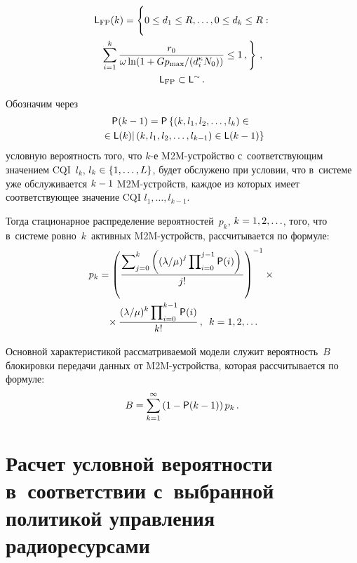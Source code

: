 \begin{multicols}{2}
  \vspace*{-12pt}
  
  \noindent
  \begin{multline}
  {\sf L}_{\mathrm{FP}}(k)= \left\{
  \vphantom{\sum\limits^k_{i=1}}
  0\leq d_1\leq R,\ldots , 0\leq d_k\leq R:\right.\\
   \left.\sum\limits^k_{i=1} \fr{r_0}{\omega\ln 
(1+Gp_{\max}/(d_i^\kappa N_0))}\leq 1\,,\right\}\,,\\
 {\sf  L}_{\mathrm{FP}}\subset {\sf L}^{\sim}\,.
  \label{e6-gud}
  \end{multline}
  
  Обозначим через 
  \begin{multline*}
  {\sf P}(k-1)={\sf P}\left\{ \left( k, l_1, l_2, \ldots , l_k\right)\in{}\right.\\
 \left. {}\in 
  {\sf L}(k)\vert \left(k,l_1,l_2,\ldots, l_{k-1}\right)\in {\sf  L}(k\hm-1)\right\}
\end{multline*} 
условную вероятность того, что $k$-е M2M-устрой\-ст\-во 
с~соответствующим значением CQI~$l_k$, $l_k\hm\in \{1,\ldots , L\}$, будет 
обслужено при условии, что в~системе уже обслуживается $k\hm-1$  
M2M-устройств, каждое из которых имеет соответствующее значение CQI 
$l_1,\ldots , l_{k-1}$. 
  
  Тогда стационарное распределение вероятностей~$p_k$, $k\hm=1,2,\ldots$, 
того, что в~системе ровно~$k$~активных M2M-устройств, рассчитывается по 
фор\-муле:
  \begin{multline*}
  p_k=\left( \displaystyle\frac{\displaystyle \sum\nolimits^k_{j=0}\left( \left( {\lambda}/{\mu}\right)^j 
\prod\nolimits_{i=0}^{j-1} {\sf P}(i)\right)\mathstrut}{\displaystyle j!\mathstrut}\right)^{-1}\times{}\\ 
{}\times \displaystyle\frac{\displaystyle (\lambda/\mu)^k \prod\nolimits_{i=0}^{k-1} {\sf P}(i)\mathstrut}{\displaystyle k!\mathstrut}\,,\enskip 
k=1,2,\ldots
  \end{multline*}
  
  Основной характеристикой рассматриваемой модели служит 
вероятность~$B$ блокировки передачи данных от M2M-устрой\-ст\-ва, которая 
рассчитывается по формуле:
  \begin{equation}
  B=\sum\limits^\infty_{k=1} \left( 1-{\sf P}(k-1)\right) p_k\,.
  \label{e8-gud}
  \end{equation}

\section{Расчет условной вероятности в~соответствии 
с~выбранной политикой управления радиоресурсами}


\end{multicols}
